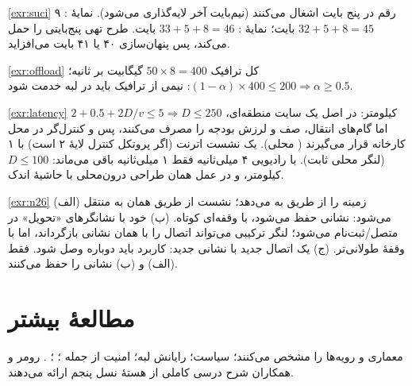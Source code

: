\documentclass[11pt,a4paper]{article}
\begin{document}
\begin{solutionbox}{\ref{exr:suci}}
۹ رقم در  پنج بایت اشغال می‌کنند (نیم‌بایت آخر لایه‌گذاری می‌شود). نمایهٔ : $32 + 5 + 8 = 45$ بایت؛ نمایهٔ :
$33 + 5 + 8 = 46$ بایت. طرح تهی  پنج‌بایتی را حمل می‌کند، پس پنهان‌سازی ۴۰ یا ۴۱ بایت می‌افزاید.
\end{solutionbox}

\begin{solutionbox}{\ref{exr:offload}}
کل ترافیک $50\times8 = 400$ گیگابیت بر ثانیه؛ $(1-\alpha)\times400 \le 200 \Rightarrow \alpha \ge 0.5$: نیمی از ترافیک باید در لبه
خدمت شود.
\end{solutionbox}

\begin{solutionbox}{\ref{exr:latency}}
$2 + 0.5 + 2D/v \le 5 \Rightarrow D \le 250$ کیلومتر: در اصل یک سایت منطقه‌ای، اما گام‌های انتقال، صف و لرزش بودجه را مصرف می‌کنند،
پس  و کنترل‌گر در محل کارخانه قرار می‌گیرند ( محلی). یک نشست اترنت (اگر پروتکل کنترل لایهٔ ۲ است) با
 ۱ (لنگر محلی ثابت). با  رادیویی ۴ میلی‌ثانیه فقط ۱ میلی‌ثانیه باقی می‌ماند: $D \le 100$ کیلومتر، و در عمل همان
طراحی درون‌محلی با حاشیهٔ اندک.
\end{solutionbox}

\begin{solutionbox}{\ref{exr:n26}}
(الف)  زمینه را از طریق  به  می‌دهد؛ نشست از طریق همان  به  منتقل
می‌شود: نشانی  حفظ می‌شود، با وقفه‌ای کوتاه. (ب)  خود با نشانگرهای «تحویل» در  متصل/ثبت‌نام می‌شود؛ لنگر
ترکیبی می‌تواند اتصال  را با همان نشانی بازگرداند، اما با وقفهٔ طولانی‌تر. (ج) یک اتصال  جدید با نشانی 
جدید: کاربرد باید دوباره وصل شود. فقط (الف) و (ب) نشانی  را حفظ می‌کنند.
\end{solutionbox}

\section{مطالعهٔ بیشتر}
 \cite{ts23501} معماری و  \cite{ts23502} رویه‌ها را مشخص می‌کنند؛  \cite{ts23503}
سیاست؛  \cite{ts23548} رایانش لبه؛  \cite{ts33501} امنیت از جمله ؛ 
\cite{ts24501} ؛  \cite{ts38413} . رومر و همکاران \cite{rommer2020core} شرح درسی کاملی از هستهٔ
نسل پنجم ارائه می‌دهند.

\begin{latin}
\printbibliography[heading=subbibliography,title={References}]
\end{latin}
\end{document}
